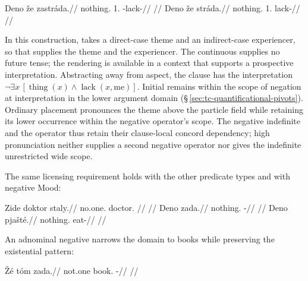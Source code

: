\pex\label{ex:nm-negative-concord}
\a
\begingl
\gla Deno že zastráda.//
\glb nothing.\Dir{} 1\Sg{}.\Ind{} \Neg{}-lack-\Cont{}//
\glft {}
//
\endgl
\a
\begingl
\gla {*}Deno že stráda.//
\glb nothing.\Dir{} 1\Sg{}.\Ind{} lack-\Cont{}//
\glft {}
//
\endgl
\xe

\noindent In this construction,  takes a direct-case theme and
an indirect-case experiencer, so that  supplies the theme and
 the experiencer. The continuous  supplies no future tense;
the rendering  is available in a context that supports
a prospective interpretation. Abstracting away from aspect, the clause has
the interpretation $\neg\exists x\,[\operatorname{thing}(x)\land
\operatorname{lack}(x,\mathrm{me})]$. Initial  remains within the
scope of negation at interpretation in the lower argument domain
(§\,\ref{sec:tc-quantificational-pivots}).
Ordinary placement pronounces the theme above the particle field while
retaining its lower occurrence within the negative operator's scope. The
negative indefinite and the operator thus retain their clause-local concord
dependency; high pronunciation neither supplies a second negative operator
nor gives the indefinite unrestricted wide scope.

The same licensing requirement holds with the other predicate types and
with negative Mood:

\pex\label{ex:nm-concord-predication}
\a
\begingl
\gla Zide doktor staly.//
\glb no.one.\Dir{} doctor.\Dir{} \NegCop{}//
\glft {}
//
\endgl
\a
\begingl
\gla Deno zada.//
\glb nothing.\Dir{} \NegExst{}-\Cont{}//
\glft {}
//
\endgl
\a
\begingl
\gla Deno pjašté.//
\glb nothing.\Dir{} eat-\Proh{}//
\glft {}
//
\endgl
\xe

An adnominal negative narrows the domain to books while preserving the
existential pattern:

\ex\label{ex:neg-concord-books}%
\begingl
\gla Žé tóm zada.//
\glb not.one book.\Dir{} \NegExst{}-\Cont{}//
\glft {}
//
\endgl
\xe

